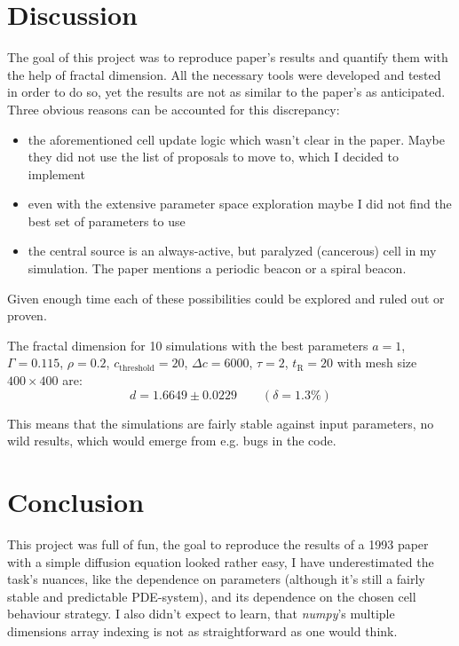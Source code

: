 \documentclass[a4paper,12pt]{article}
\begin{document}
\section{Discussion}

The goal of this project was to reproduce \cite{kessler1993} paper's results and quantify them with the help of fractal dimension. All the necessary tools were developed and tested in order to do so, yet the results are not as similar to the paper's as anticipated. Three obvious reasons can be accounted for this discrepancy: 
\begin{itemize}
 \item the aforementioned cell update logic which wasn't clear in the paper. Maybe they did not use the list of proposals to move to, which I decided to implement
 \item even with the extensive parameter space exploration maybe I did not find the best set of parameters to use
 \item the central source is an always-active, but paralyzed (cancerous) cell in my simulation. The paper \cite{kessler1993} mentions a periodic beacon or a spiral beacon.
\end{itemize}

Given enough time each of these possibilities could be explored and ruled out or proven.

The fractal dimension for 10 simulations with the best parameters $a=1$, $\Gamma=0.115$, $\rho=0.2$, $c_\text{threshold}=20$, $\Delta c=6000$, $\tau=2$, $t_\text{R}=20$ with mesh size $400 \times 400$ are:
\begin{equation}
 d = 1.6649 \pm 0.0229 \qquad (\delta=1.3\%)
\end{equation}

This means that the simulations are fairly stable against input parameters, no wild results, which would emerge from e.g. bugs in the code.

\section{Conclusion}

This project was full of fun, the goal to reproduce the results of a 1993 paper with a simple diffusion equation looked rather easy, I have underestimated the task's nuances, like the dependence on parameters (although it's still a fairly stable and predictable PDE-system), and its dependence on the chosen cell behaviour strategy. I also didn't expect to learn, that \emph{numpy}'s multiple dimensions array indexing is not as straightforward as one would think. 
\end{document}
